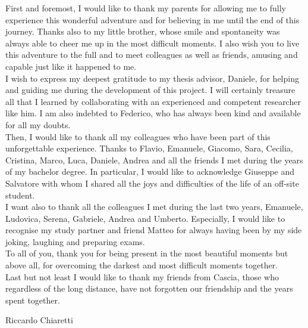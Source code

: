 \documentclass[LaM,binding=0.6cm]{sapthesis}
\begin{document}
\begin{acknowledgments}
First and foremost, I would like to thank my parents for allowing me to fully experience this wonderful adventure and for believing in me until the end of this journey. Thanks also to my little brother, whose smile and spontaneity was always able to cheer me up in the most difficult moments. I also wish you to live this adventure to the full and to meet colleagues as well as friends, amusing and capable just like it happened to me.\\

I wish to express my deepest gratitude to my thesis advisor, Daniele, for helping and guiding me during the development of this project. I will certainly treasure all that I learned by collaborating with an experienced and competent researcher like him. I am also indebted to Federico, who has always been kind and available for all my doubts.\\

Then, I would like to thank all my colleagues who have been part of this unforgettable experience. Thanks to Flavio, Emanuele, Giacomo, Sara, Cecilia, Cristina, Marco, Luca, Daniele, Andrea and all the friends I met during the years of my bachelor degree. In particular, I would like to acknowledge Giuseppe and Salvatore with whom I shared all the joys and difficulties of the life of an off-site student.\\
I want also to thank all the colleagues I met during the last two years, Emanuele, Ludovica, Serena, Gabriele, Andrea and Umberto. Especially, I would like to recognise my study partner and friend Matteo for always having been by my side joking, laughing and preparing exams.\\
To all of you, thank you for being present in the most beautiful moments but above all, for overcoming the darkest and most difficult moments together.\\

Last but not least I would like to thank my friends from Cascia, those who regardless of the long distance, have not forgotten our friendship and the years spent together.
\vspace{10mm}

\begin{flushright}
Riccardo Chiaretti
\end{flushright}
\end{acknowledgments}

\tableofcontents

\mainmatter
\end{document}
